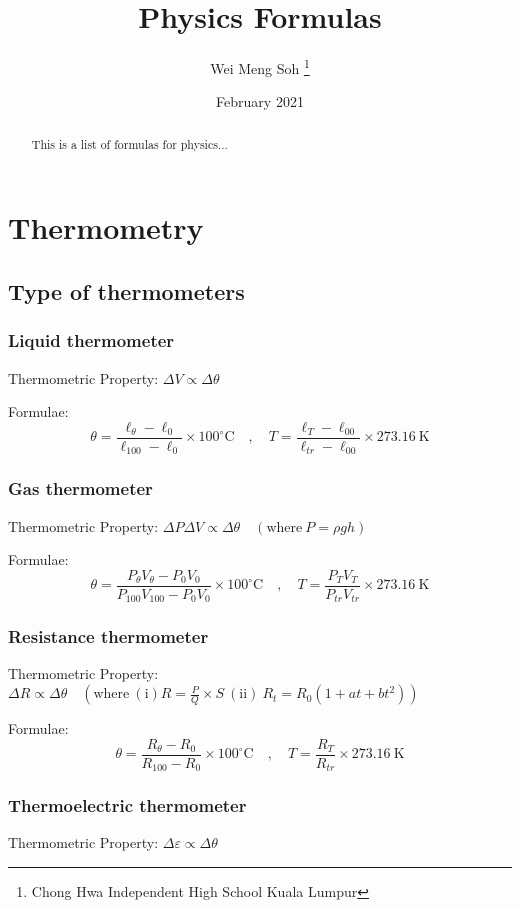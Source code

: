 \documentclass{article}
\title{Physics Formulas}
\author{Wei Meng Soh \thanks{Chong Hwa Independent High School Kuala Lumpur}}
\date{February 2021}
\begin{document}
\maketitle
\begin{abstract}
    This is a list of formulas for physics...
\end{abstract}

\section{Thermometry}
\subsection*{Type of thermometers}

\subsubsection*{Liquid thermometer}
Thermometric Property: \(\Delta V \propto \Delta \theta\)

\noindent Formulae:
\[\theta = \frac{\ell_\theta - \ell_0}{\ell_{100}-\ell_0} \times 100^{\circ} \mathrm{C} \quad, \quad T=\frac{\ell_T-\ell_{00}}{\ell_{tr}-\ell_{00}} \times 273.16\mathrm{~K} \]

\subsubsection*{Gas thermometer}
Thermometric Property: \(\Delta P \Delta V \propto \Delta \theta \quad (\mathrm{where} \ P = \rho gh)\)

\noindent Formulae:
\[\theta = \frac{P_\theta V_\theta - P_0V_0}{P_{100} V_{100} - P_0V_0} \times 100^{\circ} \mathrm{C} \quad, \quad T=\frac{P_T V_T}{P_{tr} V_{tr}} \times 273.16\mathrm{~K} \]

\subsubsection*{Resistance thermometer}
Thermometric Property: \(\Delta R \propto \Delta \theta \quad (\mathrm{where} \ (\mathrm{i}) R=\frac{P}{Q}\times S \ (\mathrm{ii})\ R_t=R_0(1+at+bt^2))\)

\noindent Formulae:
\[\theta = \frac{R_\theta - R_0}{R_{100}-R_0} \times 100^{\circ} \mathrm{C} \quad, \quad T=\frac{R_T}{R_{tr}} \times 273.16\mathrm{~K} \]


\subsubsection*{Thermoelectric thermometer}
Thermometric Property: \(\Delta \varepsilon \propto \Delta \theta\)
\end{document}
